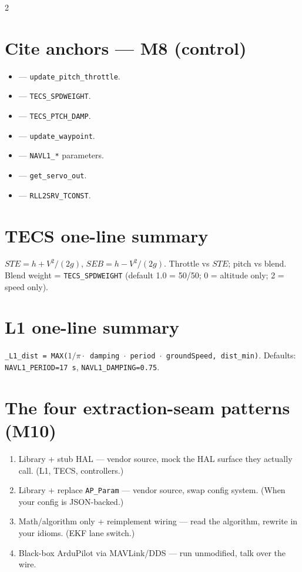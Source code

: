 \begin{multicols}{2}
\section*{Cite anchors --- M8 (control)}
\begin{itemize}\footnotesize
  \item {} --- \texttt{update\_pitch\_throttle}.
  \item {} --- \texttt{TECS\_SPDWEIGHT}.
  \item {} --- \texttt{TECS\_PTCH\_DAMP}.
  \item {} --- \texttt{update\_waypoint}.
  \item {} --- \texttt{NAVL1\_*} parameters.
  \item {} --- \texttt{get\_servo\_out}.
  \item {} --- \texttt{RLL2SRV\_TCONST}.
\end{itemize}

\section*{TECS one-line summary}
\footnotesize
$STE = h + V^2/(2g)$, $SEB = h - V^2/(2g)$. Throttle vs $STE$; pitch vs blend. Blend weight = \texttt{TECS\_SPDWEIGHT} (default 1.0 = 50/50; 0 = altitude only; 2 = speed only).

\section*{L1 one-line summary}
\footnotesize
\texttt{\_L1\_dist = MAX($1/\pi \cdot$ damping $\cdot$ period $\cdot$ groundSpeed, dist\_min)}. Defaults: \texttt{NAVL1\_PERIOD=17 s}, \texttt{NAVL1\_DAMPING=0.75}.

\section*{The four extraction-seam patterns (M10)}
\begin{enumerate}\footnotesize
  \item Library + stub HAL --- vendor source, mock the HAL surface they actually call. (L1, TECS, controllers.)
  \item Library + replace \texttt{AP\_Param} --- vendor source, swap config system. (When your config is JSON-backed.)
  \item Math/algorithm only + reimplement wiring --- read the algorithm, rewrite in your idioms. (EKF lane switch.)
  \item Black-box ArduPilot via MAVLink/DDS --- run unmodified, talk over the wire.
\end{enumerate}


\end{multicols}
